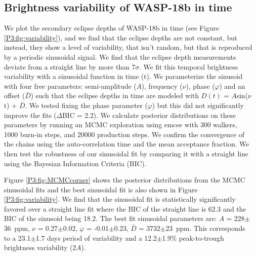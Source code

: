 \subsection{Brightness variability of WASP-18b in time}

We plot the secondary eclipse depths of WASP-18b in time (see Figure \ref{P3:fig:variability}), and we find that the eclipse depths are not constant, but instead, they show a level of variability, that isn't random, but that is reproduced by a periodic sinusoidal signal. We find that the eclipse depth measurements deviate from a straight line by more than 7$\sigma$. We fit this temporal brightness variability with a sinusoidal function in time (t).
We parameterize the sinusoid with four free parameters: semi-amplitude ($A$), frequency ($\nu$), phase ($\varphi$) and an offset ($\bar{D}$) such that the eclipse depths in time are modeled with $D(t)$ = $A$sin($\nu$t) + $\bar{D}$. We tested fixing the phase parameter ($\varphi$) but this did not significantly improve the fits ($\Delta$BIC = 2.2).
We calculate posterior distributions on these parameters by running an MCMC exploration using emcee \citep{Foreman-Mackey2013} with 300 walkers, 1000 burn-in steps, and 20000 production steps. We confirm the convergence of the chains using the auto-correlation time and the mean acceptance fraction. We then test the robustness of our sinusoidal fit by comparing it with a straight line using the Bayesian Information Criteria (BIC).

Figure \ref{P3:fig:MCMCcorner} shows the posterior distributions from the MCMC sinusoidal fits and the best sinusoidal fit is also shown in Figure \ref{P3:fig:variability}. We find that the sinusoidal fit is statistically significantly favored over a straight line fit where the BIC of the straight line is 62.3 and the BIC of the sinusoid being 18.2.
The best fit sinusoidal parameters are: $A$ = 228$\pm$36~ppm, $\nu$ = 0.27$\pm$0.02, $\varphi$ = -0.01$\pm$0.23, $\bar{D}$ = 3732$\pm$23~ppm. This corresponds to a 23.1$\pm$1.7 days period of variability and a 12.2$\pm$1.9\% peak-to-trough brightness variability (2$A$).

